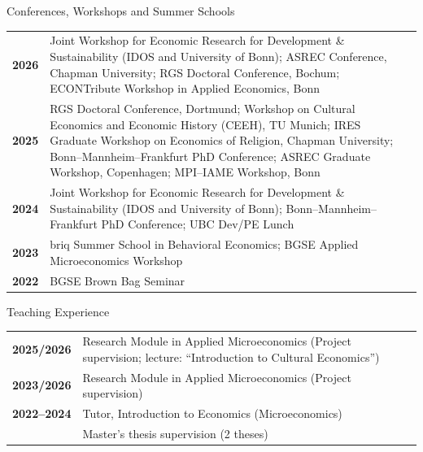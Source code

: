 \documentclass[roman]{resume}
\begin{document}
\begin{rSection}{Conferences, Workshops and Summer Schools}
	
	\begin{tabular}{@{}r p{\dimexpr\linewidth-2.6cm\relax}@{}}
		
		\textbf{2026} &
		Joint Workshop for Economic Research for Development \& Sustainability (IDOS and University of Bonn); 
		ASREC Conference, Chapman University; 
		RGS Doctoral Conference, Bochum;
		ECONTribute Workshop in Applied Economics, Bonn \\[0.6ex]
		
		\textbf{2025} &
		RGS Doctoral Conference, Dortmund; 
		Workshop on Cultural Economics and Economic History (CEEH), TU Munich; 
		IRES Graduate Workshop on Economics of Religion, Chapman University; 
		Bonn--Mannheim--Frankfurt PhD Conference; 
		ASREC Graduate Workshop, Copenhagen; 
		MPI--IAME Workshop, Bonn \\[0.6ex]
		
		\textbf{2024} &
		Joint Workshop for Economic Research for Development \& Sustainability (IDOS and University of Bonn); 
		Bonn--Mannheim--Frankfurt PhD Conference; 
		UBC Dev/PE Lunch \\[0.6ex]
		
		\textbf{2023} &
		briq Summer School in Behavioral Economics; 
		BGSE Applied Microeconomics Workshop \\[0.6ex]
		
		\textbf{2022} &
		BGSE Brown Bag Seminar \\
		
	\end{tabular}
	
\end{rSection}
	
\begin{rSection}{Teaching Experience}
	
	\begin{tabular}{@{}p{2.3cm} p{\dimexpr\linewidth-2.3cm-2\tabcolsep\relax}@{}}
		
		\textbf{2025/2026} &
		Research Module in Applied Microeconomics (Project supervision; lecture: ``Introduction to Cultural Economics'') \\[0.6ex]
		
		\textbf{2023/2026} &
		Research Module in Applied Microeconomics (Project supervision) \\[0.6ex]
		
		\textbf{2022--2024} &
		Tutor, Introduction to Economics (Microeconomics) \\[0.6ex]
		
		& Master's thesis supervision (2 theses) \\
		
	\end{tabular}
	
\end{rSection}
	
\end{document}
